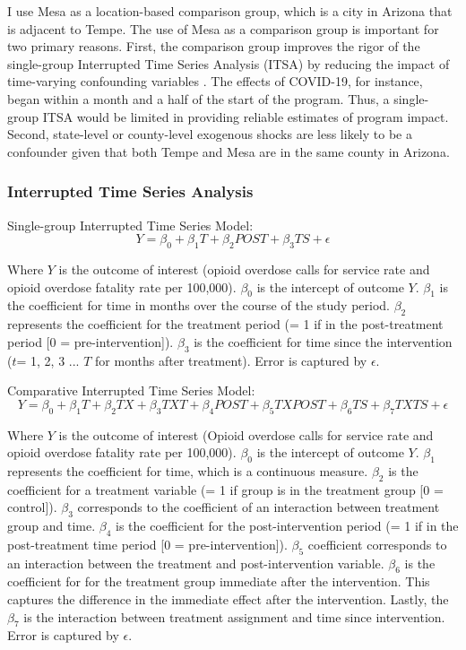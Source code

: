 I use Mesa as a location-based comparison group, which is a city in Arizona that is adjacent to Tempe. The use of Mesa as a comparison group is important for two primary reasons. First, the comparison group improves the rigor of the single-group Interrupted Time Series Analysis (ITSA) by reducing the impact of time-varying confounding variables \parencite{shadish_experimental_2002}. The effects of COVID-19, for instance, began within a month and a half of the start of the program. Thus, a single-group ITSA would be limited in providing reliable estimates of program impact. Second, state-level or county-level exogenous shocks are less likely to be a confounder given that both Tempe and Mesa are in the same county in Arizona.

\subsubsection{Interrupted Time Series Analysis}

Single-group Interrupted Time Series Model:
\[Y = \beta_0 + \beta_1 T + \beta_2 POST + \beta_3 TS + \epsilon \]

Where \(Y\) is the outcome of interest (opioid overdose calls for service rate and opioid overdose fatality rate per 100,000). \(\beta_0\) is the intercept of outcome \(Y\). \(\beta_1\) is the coefficient for time in months over the course of the study period. \(\beta_2\) represents the coefficient for the treatment period (= 1 if in the post-treatment period [0 = pre-intervention]). \(\beta_3\) is the coefficient for time since the intervention (\(t\)= 1, 2, 3 ... \(T\) for months after treatment). Error is captured by \(\epsilon\).

Comparative Interrupted Time Series Model:
\[Y = \beta_0 + \beta_1 T + \beta_2 TX + \beta_3 TXT + \beta_4 POST + \beta_5 TXPOST + \beta_6 TS + \beta_7 TXTS + \epsilon \]

Where \(Y\) is the outcome of interest (Opioid overdose calls for service rate and opioid overdose fatality rate per 100,000). \(\beta_0\) is the intercept of outcome \(Y\). \(\beta_1\) represents the coefficient for time, which is a continuous measure. \(\beta_2\) is the coefficient for a treatment variable (= 1 if group is in the treatment group [0 = control]). \(\beta_3\) corresponds to the coefficient of an interaction between treatment group and time. \(\beta_4\) is the coefficient for the post-intervention period (= 1 if in the post-treatment time period [0 = pre-intervention]). \(\beta_5\) coefficient corresponds to an interaction between the treatment and post-intervention variable. \(\beta_6\) is the coefficient for for the treatment group immediate after the intervention. This captures the difference in the immediate effect after the intervention. Lastly, the \(\beta_7\) is the interaction between treatment assignment and time since intervention. Error is captured by \(\epsilon\).

